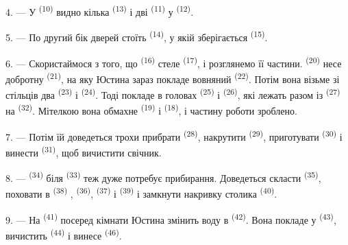 4. --- У  \textsuperscript{(10)} видно кілька 
\textsuperscript{(13)} і дві  \textsuperscript{(11)} у
 \textsuperscript{(12)}.

5. --- По другий бік дверей стоїть 
\textsuperscript{(14)}, у якій зберігається 
\textsuperscript{(15)}.

6. --- Скористаймося з того, що  \textsuperscript{(16)} стеле
 \textsuperscript{(17)}, і розглянемо її частини.
 \textsuperscript{(20)} несе добротну 
\textsuperscript{(21)}, на яку Юстина зараз покладе вовняний 
\textsuperscript{(22)}. Потім вона візьме зі стільців два 
\textsuperscript{(23)} і  \textsuperscript{(24)}. Тоді покладе в
головах  \textsuperscript{(25)} і 
\textsuperscript{(26)}, які лежать разом із 
\textsuperscript{(27)} на  \textsuperscript{(32)}.
Мітелкою вона обмахне  \textsuperscript{(19)} і
 \textsuperscript{(18)}, і частину роботи зроблено.

7. --- Потім їй доведеться трохи прибрати 
\textsuperscript{(28)}, накрутити  \textsuperscript{(29)},
приготувати  \textsuperscript{(30)} і винести 
\textsuperscript{(31)}, щоб вичистити свічник.

\VUsaut{5.0mm}
\VUsaut{3.0mm}

8. ---  \textsuperscript{(34)} біля 
\textsuperscript{(33)} теж дуже потребує прибирання. Доведеться скласти
 \textsuperscript{(35)}, поховати в 
\textsuperscript{(38)} ,  \textsuperscript{(36)},
 \textsuperscript{(37)} і  \textsuperscript{(39)} і
замкнути накривку столика  \textsuperscript{(40)}.

9. --- На  \textsuperscript{(41)} посеред кімнати Юстина
змінить воду в  \textsuperscript{(42)}. Вона покладе
 у  \textsuperscript{(43)}, вичистить
 \textsuperscript{(44)} і винесе 
\textsuperscript{(46)}.

